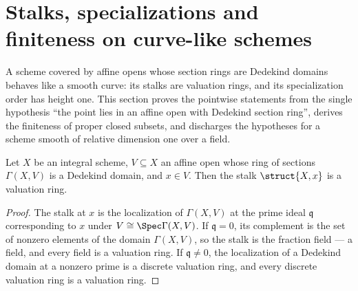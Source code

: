 \section{Stalks, specializations and finiteness on curve-like schemes}

A scheme covered by affine opens whose section rings are Dedekind domains behaves like a
smooth curve: its stalks are valuation rings, and its specialization order has height one.
This section proves the pointwise statements from the single hypothesis ``the point lies in
an affine open with Dedekind section ring'', derives the finiteness of proper closed
subsets, and discharges the hypotheses for a scheme smooth of relative dimension one over a
field.

\begin{theorem}
  \label{thm:affine_dedekind_stalk_valuation}
  \leanok
  Let \(X\) be an integral scheme, \(V \subseteq X\) an affine open whose ring of sections
  \(\Gamma(X, V)\) is a Dedekind domain, and \(x \in V\). Then the stalk
  \(\struct{X,x}\) is a valuation ring.
\end{theorem}
\begin{proof}
  \leanok
  The stalk at \(x\) is the localization of \(\Gamma(X, V)\) at the prime ideal
  \(\mathfrak q\) corresponding to \(x\) under \(V \cong \Spec \Gamma(X, V)\). If
  \(\mathfrak q = 0\), its complement is the set of nonzero elements of the domain
  \(\Gamma(X, V)\), so the stalk is the fraction field --- a field, and every field is a
  valuation ring. If \(\mathfrak q \neq 0\), the localization of a Dedekind domain at a
  nonzero prime is a discrete valuation ring, and every discrete valuation ring is a
  valuation ring.
\end{proof}

